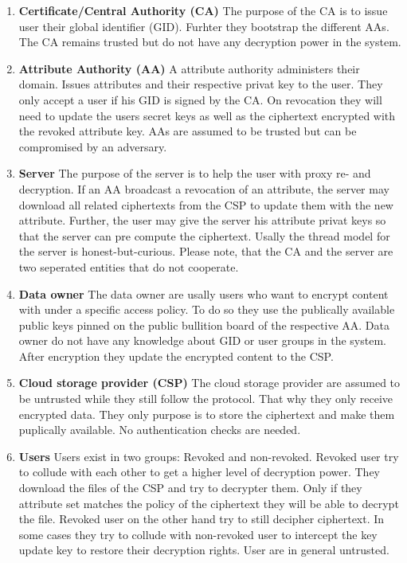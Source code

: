 \begin{enumerate}
	\item \textbf{Certificate/Central Authority (CA)} The purpose of the CA is to issue user their global identifier (GID). Furhter they bootstrap the different AAs. The CA remains trusted but do not have any decryption power in the system. 
	\item \textbf{Attribute Authority (AA)} A attribute authority administers their domain. Issues attributes and their respective privat key to the user. They only accept a user if his GID is signed by the CA. 
	On revocation they will need to update the users secret keys as well as the ciphertext encrypted with the revoked attribute key. AAs are assumed to be trusted but can be compromised by an adversary.
	\item \textbf{Server} The purpose of the server is to help the user with proxy re- and decryption. If an AA broadcast a revocation of an attribute, the server may download all related ciphertexts from the CSP to update them with the new attribute. 
	Further, the user may give the server his attribute privat keys so that the server can pre compute the ciphertext. Usally the thread model for the server is honest-but-curious. Please note, that the CA and the server are two seperated entities that do not cooperate.
	\item \textbf{Data owner} The data owner are usally users who want to encrypt content with under a specific access policy. To do so they use the publically available public keys pinned on the public bullition board of the respective AA. Data owner do not have any knowledge about GID or user groups in the system. After encryption they update the encrypted content to the CSP.
	\item \textbf{Cloud storage provider (CSP)} The cloud storage provider are assumed to be untrusted while they still follow the protocol. That why they only receive encrypted data. They only purpose is to store the ciphertext and make them puplically available. No authentication checks are needed.
	\item \textbf{Users} Users exist in two groups: Revoked and non-revoked. Revoked user try to collude with each other to get a higher level of decryption power. They download the files of the CSP and try to decrypter them. Only if they attribute set matches the policy of the ciphertext they will be able to decrypt the file. 
	Revoked user on the other hand try to still decipher ciphertext. In some cases they try to collude with non-revoked user to intercept the key update key to restore their decryption rights. 
	User are in general untrusted.
\end{enumerate} 

